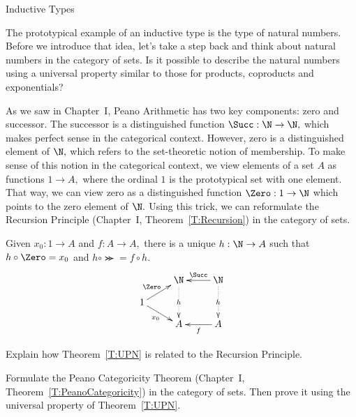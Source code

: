 \begin{unit}{Inductive Types}

The prototypical example of an inductive type is the type of natural numbers.
Before we introduce that idea, let's take a step back and think about natural numbers in the category of sets.
Is it possible to describe the natural numbers using a universal property similar to those for products, coproducts and exponentials?

As we saw in Chapter~I, Peano Arithmetic has two key components: zero and successor.
The successor is a distinguished function \(\Succ:\N\to\N,\) which makes perfect sense in the categorical context.
However, zero is a distinguished element of \(\N,\) which refers to the set-theoretic notion of membership.
To make sense of this notion in the categorical context, we view elements of a set \(A\) as functions \(1 \to A,\) where the ordinal \(1\) is the prototypical set with one element.
That way, we can view zero as a distinguished function \(\Zero:1\to \N\) which points to the zero element of \(\N.\)
Using this trick, we can reformulate the Recursion Principle (Chapter~I, Theorem~\ref{T:Recursion}) in the category of sets.

\begin{theorem}\label{T:UPN}
  Given \(x_0:1 \to A\) and \(f:A \to A,\) there is a unique \(h:\N\to A\) such that \(h \circ \Zero = x_0\) and \(h \circ \Succ = f \circ h.\)
  \[\xymatrix@R1em{
    & \N \ar@{.>}[dd]|-{h} & \N \ar@{.>}[dd]|-{h} \ar[l]_-{\Succ} \\
    1 \ar[ur]^-{\Zero} \ar[dr]_-{x_0}  \\
    & A & A \ar[l]^-{f}
  }\]
\end{theorem}

\begin{problem}
  Explain how Theorem~\ref{T:UPN} is related to the Recursion Principle.
\end{problem}

\begin{problem}
  Formulate the Peano Categoricity Theorem (Chapter~I, Theorem~\ref{T:PeanoCategoricity}) in the category of sets.
  Then prove it using the universal property of Theorem~\ref{T:UPN}.
\end{problem}


\end{unit}
